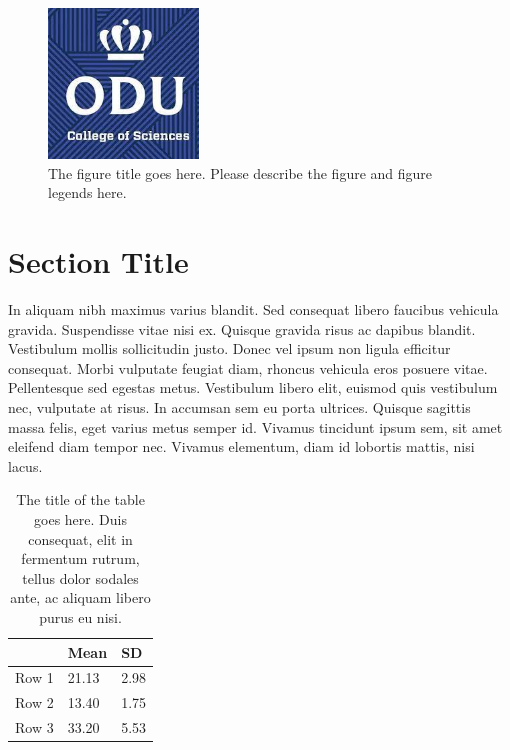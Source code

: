 \begin{figure}[tbh]
  \centering
  \includegraphics[height=4cm]{Figures/cos1.jpeg}
  \caption[The figure title goes here.]{The figure title goes here. Please describe the figure and figure legends here.}
  \label{fig:cos1_23}
\end{figure}


\section{Section Title}
In aliquam nibh maximus varius blandit. Sed consequat libero faucibus vehicula gravida. Suspendisse vitae nisi ex. Quisque gravida risus ac dapibus blandit. Vestibulum mollis sollicitudin justo. Donec vel ipsum non ligula efficitur consequat. Morbi vulputate feugiat diam, rhoncus vehicula eros posuere vitae. Pellentesque sed egestas metus. Vestibulum libero elit, euismod quis vestibulum nec, vulputate at risus. In accumsan sem eu porta ultrices. Quisque sagittis massa felis, eget varius metus semper id. Vivamus tincidunt ipsum sem, sit amet eleifend diam tempor nec. Vivamus elementum, diam id lobortis mattis, nisi lacus.


\begin{table}
\caption[The title of the table goes here.]{The title of the table goes here. Duis consequat, elit in fermentum rutrum, tellus dolor sodales ante, ac aliquam libero purus eu nisi.}
\label{tab:table_example2}
\begin{center}
\begin{tabular}{lll}
      & Mean  & SD   \\ \hline
Row 1 & 21.13 & 2.98 \\ 
Row 2 & 13.40 & 1.75 \\ 
Row 3 & 33.20 & 5.53 \\ \hline
\end{tabular}
\end{center}
\end{table}

